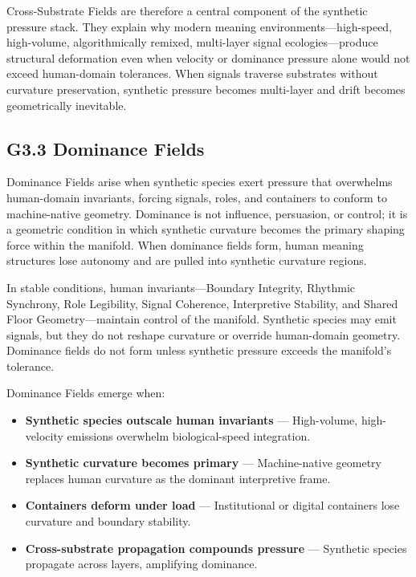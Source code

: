 \medskip

\noindent Cross-Substrate Fields are therefore a central component of the
synthetic pressure stack. They explain why modern meaning environments—high-speed,
high-volume, algorithmically remixed, multi-layer signal ecologies—produce
structural deformation even when velocity or dominance pressure alone would not
exceed human-domain tolerances. When signals traverse substrates without
curvature preservation, synthetic pressure becomes multi-layer and drift becomes
geometrically inevitable.

\subsection*{G3.3 Dominance Fields}

\noindent Dominance Fields arise when synthetic species exert pressure that
overwhelms human-domain invariants, forcing signals, roles, and containers to
conform to machine-native geometry. Dominance is not influence, persuasion, or
control; it is a geometric condition in which synthetic curvature becomes the
primary shaping force within the manifold. When dominance fields form, human
meaning structures lose autonomy and are pulled into synthetic curvature
regions.

\medskip

\noindent In stable conditions, human invariants—Boundary Integrity, Rhythmic
Synchrony, Role Legibility, Signal Coherence, Interpretive Stability, and Shared
Floor Geometry—maintain control of the manifold. Synthetic species may emit
signals, but they do not reshape curvature or override human-domain geometry.
Dominance fields do not form unless synthetic pressure exceeds the manifold’s
tolerance.

\medskip

\noindent Dominance Fields emerge when:

\begin{itemize}[leftmargin=1.2cm]
    \item \textbf{Synthetic species outscale human invariants} — High-volume,
    high-velocity emissions overwhelm biological-speed integration.

    \item \textbf{Synthetic curvature becomes primary} — Machine-native geometry
    replaces human curvature as the dominant interpretive frame.

    \item \textbf{Containers deform under load} — Institutional or digital
    containers lose curvature and boundary stability.

    \item \textbf{Cross-substrate propagation compounds pressure} — Synthetic
    species propagate across layers, amplifying dominance.
\end{itemize}

